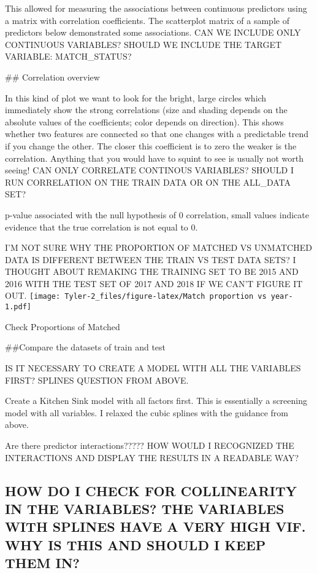 \documentclass[12pt,]{article}
\begin{document}
This allowed for measuring the associations between continuous
predictors using a matrix with correlation coefficients. The scatterplot
matrix of a sample of predictors below demonstrated some associations.
CAN WE INCLUDE ONLY CONTINUOUS VARIABLES? SHOULD WE INCLUDE THE TARGET
VARIABLE: MATCH\_STATUS?

\#\# Correlation overview

In this kind of plot we want to look for the bright, large circles which
immediately show the strong correlations (size and shading depends on
the absolute values of the coefficients; color depends on direction).
This shows whether two features are connected so that one changes with a
predictable trend if you change the other. The closer this coefficient
is to zero the weaker is the correlation. Anything that you would have
to squint to see is usually not worth seeing! CAN ONLY CORRELATE
CONTINOUS VARIABLES? SHOULD I RUN CORRELATION ON THE TRAIN DATA OR ON
THE ALL\_DATA SET?

p-value associated with the null hypothesis of 0 correlation, small
values indicate evidence that the true correlation is not equal to 0.

I'M NOT SURE WHY THE PROPORTION OF MATCHED VS UNMATCHED DATA IS
DIFFERENT BETWEEN THE TRAIN VS TEST DATA SETS? I THOUGHT ABOUT REMAKING
THE TRAINING SET TO BE 2015 AND 2016 WITH THE TEST SET OF 2017 AND 2018
IF WE CAN'T FIGURE IT OUT.
\texttt{[image: Tyler-2\_files/figure-latex/Match proportion vs year-1.pdf]}

Check Proportions of Matched

\#\#Compare the datasets of train and test

IS IT NECESSARY TO CREATE A MODEL WITH ALL THE VARIABLES FIRST? SPLINES
QUESTION FROM ABOVE.

Create a Kitchen Sink model with all factors first. This is essentially
a screening model with all variables. I relaxed the cubic splines with
the guidance from above.

Are there predictor interactions????? HOW WOULD I RECOGNIZED THE
INTERACTIONS AND DISPLAY THE RESULTS IN A READABLE WAY?

\hypertarget{how-do-i-check-for-collinearity-in-the-variables-the-variables-with-splines-have-a-very-high-vif.-why-is-this-and-should-i-keep-them-in}{%
\subsection{HOW DO I CHECK FOR COLLINEARITY IN THE VARIABLES? THE
VARIABLES WITH SPLINES HAVE A VERY HIGH VIF. WHY IS THIS AND SHOULD I
KEEP THEM
IN?}\label{how-do-i-check-for-collinearity-in-the-variables-the-variables-with-splines-have-a-very-high-vif.-why-is-this-and-should-i-keep-them-in}}
\end{document}
